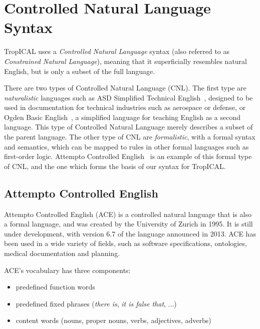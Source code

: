 \documentclass[11pt]{report}
\begin{document}
\section{Controlled Natural Language Syntax}
\label{sec:t-constrained}

TropICAL uses a \emph{Controlled Natural Language} syntax (also referred to as
\emph{Constrained Natural Language}), meaning that it superficially
resembles natural English, but is only a subset of the full language.

There are two types of Controlled Natural Language (CNL). The first type are \emph{naturalistic} languages
such as ASD Simplified Technical English~\citep{asd2007simplified}, designed to
be used in documentation for technical industries such as aerospace or defense,
or Ogden Basic English~\citep{ogden1944basic}, a simplified language for teaching
English as a second language. This type of Controlled Natural Language merely
describes a subset of the parent language. The other type of CNL are
\emph{formalistic}, with a formal
syntax and semantics, which can be mapped to rules in other formal languages
such as first-order logic. Attempto Controlled English~\citep{fuchs1996attempto}
is an example of this formal type of CNL, and the one which forms the basis of
our syntax for TropICAL.

\subsection{Attempto Controlled English}

Attempto Controlled English (ACE) is a controlled natural language that is also
a formal language, and was created by the University of Zurich in 1995. It is
still under development, with version 6.7 of the language announced in 2013. ACE
has been used in a wide variety of fields, such as software specifications,
ontologies, medical documentation and planning.

ACE's vocabulary has three components:

\begin{itemize}
  \item predefined function words
  \item predefined fixed phrases (\emph{there is}, \emph{it is false that}, ...)
  \item content words (nouns, proper nouns, verbs, adjectives, adverbs)
\end{itemize}
\end{document}
